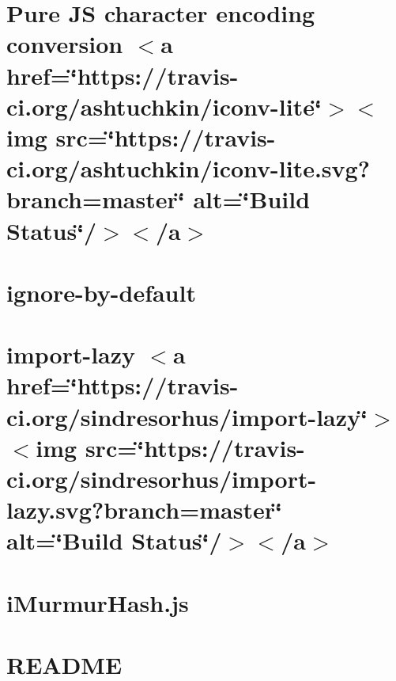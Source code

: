 \let\mypdfximage\pdfximage\def\pdfximage{\immediate\mypdfximage}\documentclass[twoside]{book}
\newcommand{\+}{\discretionary{\mbox{\scriptsize$\hookleftarrow$}}{}{}}
\begin{document}
\chapter{Pure JS character encoding conversion $<$a href=\char`\"{}https\+://travis-\/ci.\+org/ashtuchkin/iconv-\/lite\char`\"{}$>$$<$img src=\char`\"{}https\+://travis-\/ci.\+org/ashtuchkin/iconv-\/lite.\+svg?branch=master\char`\"{} alt=\char`\"{}\+Build Status\char`\"{}/$>$$<$/a$>$}
\label{md__c_1__git_hub__p_r_o_y_e_c_t_o-_i_i_i-_g_o_t_rest-api_node_modules_iconv-lite__r_e_a_d_m_e}

\chapter{ignore-\/by-\/default}
\label{md__c_1__git_hub__p_r_o_y_e_c_t_o-_i_i_i-_g_o_t_rest-api_node_modules_ignore-by-default__r_e_a_d_m_e}

\chapter{import-\/lazy $<$a href=\char`\"{}https\+://travis-\/ci.\+org/sindresorhus/import-\/lazy\char`\"{}$>$$<$img src=\char`\"{}https\+://travis-\/ci.\+org/sindresorhus/import-\/lazy.\+svg?branch=master\char`\"{} alt=\char`\"{}\+Build Status\char`\"{}/$>$$<$/a$>$}
\label{md__c_1__git_hub__p_r_o_y_e_c_t_o-_i_i_i-_g_o_t_rest-api_node_modules_import-lazy_readme}

\chapter{i\+Murmur\+Hash.\+js}
\label{md__c_1__git_hub__p_r_o_y_e_c_t_o-_i_i_i-_g_o_t_rest-api_node_modules_imurmurhash__r_e_a_d_m_e}

\chapter{R\+E\+A\+D\+ME}
\label{md__c_1__git_hub__p_r_o_y_e_c_t_o-_i_i_i-_g_o_t_rest-api_node_modules_inherits__r_e_a_d_m_e}

\end{document}
